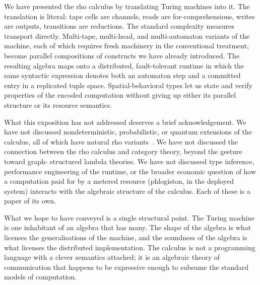 \documentclass[11pt]{article}
\theoremstyle{plain}
\theoremstyle{definition}
\theoremstyle{remark}
\begin{document}
We have presented the rho calculus by translating Turing machines into
it. The translation is literal: tape cells are channels, reads are
for-comprehensions, writes are outputs, transitions are reductions. The
standard complexity measures transport directly. Multi-tape, multi-head,
and multi-automaton variants of the machine, each of which requires fresh
machinery in the conventional treatment, become parallel compositions of
constructs we have already introduced. The resulting algebra maps onto a
distributed, fault-tolerant runtime in which the same syntactic
expression denotes both an automaton step and a committed entry in a
replicated tuple space. Spatial-behavioral types let us state and verify
properties of the encoded computation without giving up either its
parallel structure or its resource semantics.

What this exposition has not addressed deserves a brief
acknowledgement. We have not discussed nondeterministic, probabilistic,
or quantum extensions of the calculus, all of which have natural rho
variants~\cite{MQCalc}. We have not discussed the connection between
the rho calculus and category theory, beyond the gesture toward graph-
structured lambda theories. We have not discussed type inference,
performance engineering of the runtime, or the broader economic question
of how a computation paid for by a metered resource (phlogiston, in the
deployed system) interacts with the algebraic structure of the calculus.
Each of these is a paper of its own.

What we hope to have conveyed is a single structural point. The Turing
machine is one inhabitant of an algebra that has many. The shape of the
algebra is what licenses the generalisations of the machine, and the
soundness of the algebra is what licenses the distributed implementation.
The calculus is not a programming language with a clever semantics
attached; it is an algebraic theory of communication that happens to be
expressive enough to subsume the standard models of computation.
\end{document}
